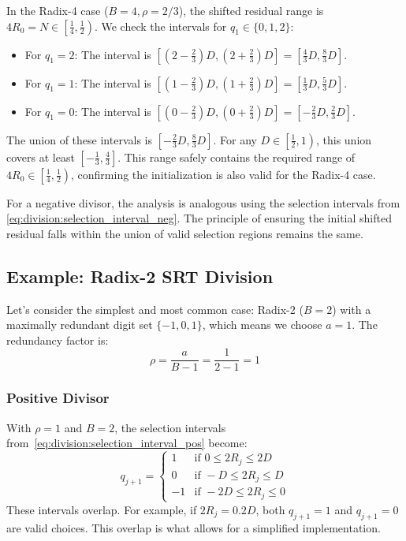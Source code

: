 \documentclass{article}
\begin{document}
In the Radix-4 case ($B = 4, \rho = 2/3$), the shifted residual range is $4 R_0 = N \in \left[\frac{1}{4}, \frac{1}{2}\right)$.
We check the intervals for $q_1 \in \{0, 1, 2\}$:
\begin{itemize}
    \item For $q_1 = 2$: The interval is $\left[\left(2-\frac{2}{3}\right)D, \left(2+\frac{2}{3}\right)D\right] = \left[\frac{4}{3}D, \frac{8}{3}D\right]$.
    \item For $q_1 = 1$: The interval is $\left[\left(1-\frac{2}{3}\right)D, \left(1+\frac{2}{3}\right)D\right] = \left[\frac{1}{3}D, \frac{5}{3}D\right]$.
    \item For $q_1 = 0$: The interval is $\left[\left(0-\frac{2}{3}\right)D, \left(0+\frac{2}{3}\right)D\right] = \left[-\frac{2}{3}D, \frac{2}{3}D\right]$.
\end{itemize}
The union of these intervals is $\left[-\frac{2}{3}D, \frac{8}{3}D\right]$.
For any $D \in \left[\frac{1}{2}, 1\right)$, this union covers at least $\left[-\frac{1}{3}, \frac{4}{3}\right]$.
This range safely contains the required range of $4 R_0 \in \left[\frac{1}{4}, \frac{1}{2}\right)$, confirming the initialization is also valid for the Radix-4 case.

For a negative divisor, the analysis is analogous using the selection intervals from \cref{eq:division:selection_interval_neg}.
The principle of ensuring the initial shifted residual falls within the union of valid selection regions remains the same.

\subsection{Example: Radix-2 SRT Division}
\label{ssec:division:radix2}
Let's consider the simplest and most common case: Radix-2 ($B = 2$) with a maximally redundant digit set $\{-1, 0, 1\}$, which means we choose $a = 1$.
The redundancy factor is:
\begin{equation}
  \label{eq:division:radix2_rho}
  \rho = \frac{a}{B-1} = \frac{1}{2-1} = 1
\end{equation}

\subsubsection{Positive Divisor}
\label{sssec:division:radix2_pos}
With $\rho = 1$ and $B = 2$, the selection intervals from~\cref{eq:division:selection_interval_pos} become:
\begin{equation}
  \label{eq:division:radix2_intervals_pos}
  q_{j+1} =
  \begin{cases}
    1  & \text{if } 0 \leq 2 R_j \leq 2 D \\
    0  & \text{if } -D \leq 2 R_j \leq D \\
    -1 & \text{if } -2 D \leq 2 R_j \leq 0
  \end{cases}
\end{equation}
These intervals overlap.
For example, if $2R_j = 0.2D$, both $q_{j+1} = 1$ and $q_{j+1} = 0$ are valid choices.
This overlap is what allows for a simplified implementation.
\end{document}
